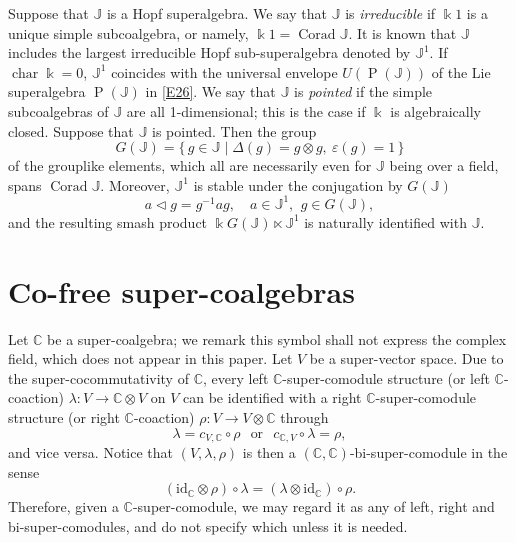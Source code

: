 \documentclass[11pt, a4paper]{amsart}
\theoremstyle{definition}
\numberwithin{equation}{section}
\begin{document}
Suppose that $\mathbb{J}$ is a Hopf superalgebra. 
We say that $\mathbb{J}$ is \emph{irreducible} if $\Bbbk 1$ is a unique simple subcoalgebra, or namely, $\Bbbk 1 = \operatorname{Corad}\mathbb{J}$.
It is known that $\mathbb{J}$ includes the largest irreducible Hopf sub-superalgebra denoted by $\mathbb{J}^{1}$.
If $\operatorname{char} \Bbbk = 0$, $\mathbb{J}^{1}$ coincides with the universal envelope $U(\operatorname{P}(\mathbb{J}))$ of the Lie superalgebra $\operatorname{P}(\mathbb{J})$ in \eqref{E26}.
We say that $\mathbb{J}$ is \emph{pointed} if the simple subcoalgebras of $\mathbb{J}$ are all 1-dimensional; this is the case if $\Bbbk$ is algebraically closed.
Suppose that $\mathbb{J}$ is pointed.
Then the group
\[ G(\mathbb{J}) = \{\, g \in \mathbb{J} \mid \Delta(g)=g \otimes g,\ \varepsilon(g)=1 \, \} \]
of the grouplike elements, which all are necessarily even for $\mathbb{J}$ being over a field, 
spans $\operatorname{Corad}\mathbb{J}$.
Moreover, $\mathbb{J}^{1}$ is stable under the conjugation by $G(\mathbb{J})$
\[ a \triangleleft g = g^{-1} a g,\quad a \in \mathbb{J}^{1},\ \, g \in G(\mathbb{J}), \]
and the resulting 
smash product $\Bbbk G(\mathbb{J}) \ltimes \mathbb{J}^{1}$
is naturally identified with $\mathbb{J}$.


\section{Co-free super-coalgebras}\label{Sec3}


Let $\mathbb{C}$ be a super-coalgebra; we remark this symbol shall not express the complex field, which does not appear in this paper.
Let $V$ be a super-vector space.
Due to the super-cocommutativity of $\mathbb{C}$, every left $\mathbb{C}$-super-comodule structure 
(or left $\mathbb{C}$-coaction) $\lambda: V \to \mathbb{C} \otimes V$  on $V$ can be identified with a right $\mathbb{C}$-super-comodule structure (or right $\mathbb{C}$-coaction) $\rho : V \to V \otimes \mathbb{C}$ through
\begin{equation}\label{E31}
\lambda = c_{V, \mathbb{C}} \circ \rho\ \, \text{ or } \ \, c_{\mathbb{C}, V} \circ \lambda = \rho,
\end{equation}
and vice versa.
Notice that $(V, \lambda, \rho)$ is then a $(\mathbb{C}, \mathbb{C})$-bi-super-comodule in the sense
\[ (\mathrm{id}_{\mathbb{C}} \otimes \rho) \circ \lambda =(\lambda \otimes \mathrm{id}_{\mathbb{C}}) \circ \rho. \]
Therefore, given a $\mathbb{C}$-super-comodule, we may regard it as any of left, right and bi-super-comodules, and do not specify which unless it is needed.
\end{document}
